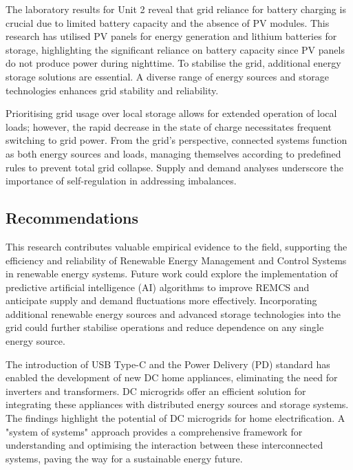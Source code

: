 The laboratory results for Unit 2 reveal that grid reliance for battery charging is crucial due to limited battery capacity and the absence of PV modules. This research has utilised PV panels for energy generation and lithium batteries for storage, highlighting the significant reliance on battery capacity since PV panels do not produce power during nighttime. To stabilise the grid, additional energy storage solutions are essential. A diverse range of energy sources and storage technologies enhances grid stability and reliability.\par
Prioritising grid usage over local storage allows for extended operation of local loads; however, the rapid decrease in the state of charge necessitates frequent switching to grid power. From the grid’s perspective, connected systems function as both energy sources and loads, managing themselves according to predefined rules to prevent total grid collapse. Supply and demand analyses underscore the importance of self-regulation in addressing imbalances.\par
\subsection{Recommendations}
This research contributes valuable empirical evidence to the field, supporting the efficiency and reliability of Renewable Energy Management and Control Systems in renewable energy systems. Future work could explore the implementation of predictive artificial intelligence (AI) algorithms to improve REMCS and anticipate supply and demand fluctuations more effectively. Incorporating additional renewable energy sources and advanced storage technologies into the grid could further stabilise operations and reduce dependence on any single energy source.\par
The introduction of USB Type-C and the Power Delivery (PD) standard has enabled the development of new DC home appliances, eliminating the need for inverters and transformers. DC microgrids offer an efficient solution for integrating these appliances with distributed energy sources and storage systems.
The findings highlight the potential of DC microgrids for home electrification. A "system of systems" approach provides a comprehensive framework for understanding and optimising the interaction between these interconnected systems, paving the way for a sustainable energy future. 

